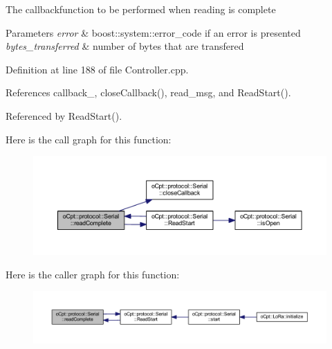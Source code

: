 The callbackfunction to be performed when reading is complete 
\begin{DoxyParams}{Parameters}
{\em error} & boost\+::system\+::error\+\_\+code if an error is presented \\
\hline
{\em bytes\+\_\+transferred} & number of bytes that are transfered \\
\hline
\end{DoxyParams}


Definition at line 188 of file Controller.\+cpp.



References callback\+\_\+, close\+Callback(), read\+\_\+msg, and Read\+Start().



Referenced by Read\+Start().

Here is the call graph for this function\+:\nopagebreak
\begin{figure}[H]
\begin{center}
\leavevmode
\includegraphics[width=350pt]{classo_cpt_1_1protocol_1_1_serial_ac7d84ba0853d120852157c490bdcd097_cgraph}
\end{center}
\end{figure}
Here is the caller graph for this function\+:\nopagebreak
\begin{figure}[H]
\begin{center}
\leavevmode
\includegraphics[width=350pt]{classo_cpt_1_1protocol_1_1_serial_ac7d84ba0853d120852157c490bdcd097_icgraph}
\end{center}
\end{figure}
\hypertarget{classo_cpt_1_1protocol_1_1_serial_a34fd0ec3f90b067eb7f749f39986d31d}{}\label{classo_cpt_1_1protocol_1_1_serial_a34fd0ec3f90b067eb7f749f39986d31d} 
